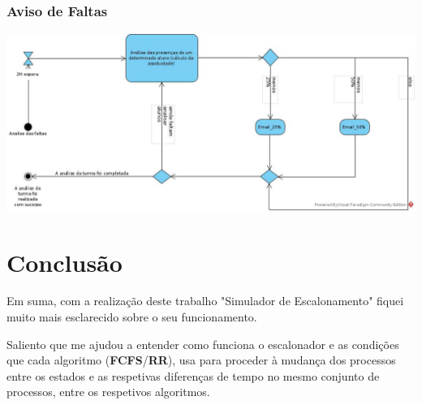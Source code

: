 \documentclass[11pt]{article}   %
\begin{document}
\subsubsection{Aviso de Faltas}
    \includegraphics[width=\textwidth]{images/diagrama_atividades_faltas.png}

\newpage
\section{Conclusão} %
\hspace{0,5cm}Em suma, com a realização deste trabalho "Simulador de Escalonamento" fiquei muito mais esclarecido sobre o seu funcionamento. \par
Saliento que me ajudou a entender como funciona o escalonador e as condições que cada algoritmo (\textbf{FCFS}/\textbf{RR}), usa para proceder à mudança dos processos entre os estados e as respetivas diferenças de tempo no mesmo conjunto de processos, entre os respetivos algoritmos.  
\end{document}
